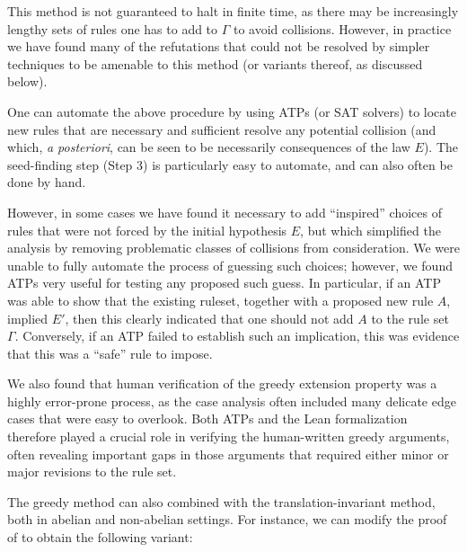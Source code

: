 This method is not guaranteed to halt in finite time, as there may be increasingly lengthy sets of rules one has to add to $\Gamma$ to avoid collisions.  However, in practice we have found many of the refutations that could not be resolved by simpler techniques to be amenable to this method (or variants thereof, as discussed below).

One can automate the above procedure by using ATPs (or SAT solvers) to locate new rules that are necessary and sufficient resolve any potential collision (and which, \emph{a posteriori}, can be seen to be necessarily consequences of the law $E$).  The seed-finding step (Step 3) is particularly easy to automate, and can also often be done by hand.  

However, in some cases we have found it necessary to add ``inspired'' choices of rules that were not forced by the initial hypothesis $E$, but which simplified the analysis by removing problematic classes of collisions from consideration.  We were unable to fully automate the process of guessing such choices; however, we found ATPs very useful for testing any proposed such guess.  In particular, if an ATP was able to show that the existing ruleset, together with a proposed new rule $A$, implied $E'$, then this clearly indicated that one should not add $A$ to the rule set $\Gamma$.  Conversely, if an ATP failed to establish such an implication, this was evidence that this was a ``safe'' rule to impose.

We also found that human verification of the greedy extension property was a highly error-prone process, as the case analysis often included many delicate edge cases that were easy to overlook.  Both ATPs and the Lean formalization therefore played a crucial role in verifying the human-written greedy arguments, often revealing important gaps in those arguments that required either minor or major revisions to the rule set.

The greedy method can also combined with the translation-invariant method, both in abelian and non-abelian settings. For instance, we can modify the proof of  to obtain the following variant:

